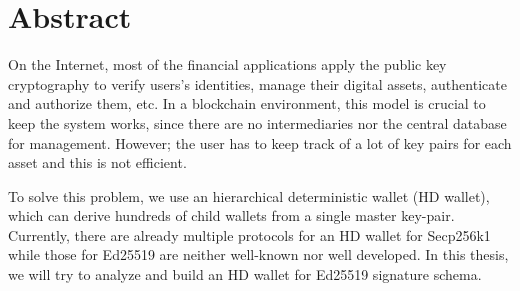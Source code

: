 \chapter*{Abstract}
\thispagestyle{fancy}
\label{abstract}
\hspace*{5cm}

On the Internet, most of the financial applications apply the public key cryptography to verify users's identities, manage their digital assets, authenticate and authorize them, etc. In a blockchain environment, this model is crucial to keep the system works, since there are no intermediaries nor the central database for management. However; the user has to keep track of a lot of key pairs for each asset and this is not efficient.

To solve this problem, we use an hierarchical deterministic wallet (HD wallet), which can derive hundreds of child wallets from a single master key-pair. Currently, there are already multiple protocols for an HD wallet for Secp256k1 while those for Ed25519 are neither well-known nor well developed. In this thesis, we will try to analyze and build an HD wallet for Ed25519 signature schema.

\cleardoublepage
